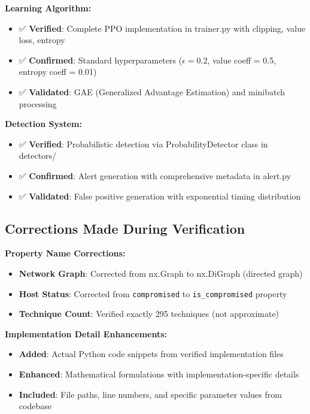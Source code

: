 \documentclass[12pt,a4paper]{article}
\begin{document}
\textbf{Learning Algorithm:}
\begin{itemize}
    \item ✅ \textbf{Verified}: Complete PPO implementation in trainer.py with clipping, value loss, entropy
    \item ✅ \textbf{Confirmed}: Standard hyperparameters ($\epsilon = 0.2$, value coeff = 0.5, entropy coeff = 0.01)
    \item ✅ \textbf{Validated}: GAE (Generalized Advantage Estimation) and minibatch processing
\end{itemize}

\textbf{Detection System:}
\begin{itemize}
    \item ✅ \textbf{Verified}: Probabilistic detection via ProbabilityDetector class in detectors/
    \item ✅ \textbf{Confirmed}: Alert generation with comprehensive metadata in alert.py
    \item ✅ \textbf{Validated}: False positive generation with exponential timing distribution
\end{itemize}

\subsection{Corrections Made During Verification}

\textbf{Property Name Corrections:}
\begin{itemize}
    \item \textbf{Network Graph}: Corrected from nx.Graph to nx.DiGraph (directed graph)
    \item \textbf{Host Status}: Corrected from \texttt{compromised} to \texttt{is\_compromised} property
    \item \textbf{Technique Count}: Verified exactly 295 techniques (not approximate)
\end{itemize}

\textbf{Implementation Detail Enhancements:}
\begin{itemize}
    \item \textbf{Added}: Actual Python code snippets from verified implementation files
    \item \textbf{Enhanced}: Mathematical formulations with implementation-specific details
    \item \textbf{Included}: File paths, line numbers, and specific parameter values from codebase
\end{itemize}
\end{document}
